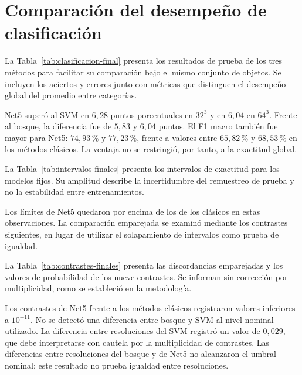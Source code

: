 \section{Comparación del desempeño de clasificación}
\label{sec:comparacion-clasificacion}
La Tabla~\ref{tab:clasificacion-final} presenta los resultados de prueba de los tres métodos para facilitar su comparación bajo el mismo conjunto de objetos. Se incluyen los aciertos y errores junto con métricas que distinguen el desempeño global del promedio entre categorías.


Net5 superó al SVM en $6{,}28$ puntos porcentuales en $32^3$ y en $6{,}04$ en $64^3$. Frente al bosque, la diferencia fue de $5{,}83$ y $6{,}04$ puntos. El F1 macro también fue mayor para Net5: $74{,}93\,\%$ y $77{,}23\,\%$, frente a valores entre $65{,}82\,\%$ y $68{,}53\,\%$ en los métodos clásicos. La ventaja no se restringió, por tanto, a la exactitud global.

La Tabla~\ref{tab:intervalos-finales} presenta los intervalos de exactitud para los modelos fijos. Su amplitud describe la incertidumbre del remuestreo de prueba y no la estabilidad entre entrenamientos.


Los límites de Net5 quedaron por encima de los de los clásicos en estas observaciones. La comparación emparejada se examinó mediante los contrastes siguientes, en lugar de utilizar el solapamiento de intervalos como prueba de igualdad.

La Tabla~\ref{tab:contrastes-finales} presenta las discordancias emparejadas y los valores de probabilidad de los nueve contrastes. Se informan sin corrección por multiplicidad, como se estableció en la metodología.


Los contrastes de Net5 frente a los métodos clásicos registraron valores inferiores a $10^{-11}$. No se detectó una diferencia entre bosque y SVM al nivel nominal utilizado. La diferencia entre resoluciones del SVM registró un valor de $0{,}029$, que debe interpretarse con cautela por la multiplicidad de contrastes. Las diferencias entre resoluciones del bosque y de Net5 no alcanzaron el umbral nominal; este resultado no prueba igualdad entre resoluciones.


